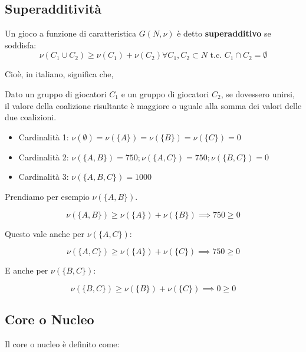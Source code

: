 \subsection{Superadditività}

Un gioco a funzione di caratteristica $G(N,\nu)$ è detto \textbf{superadditivo}
se soddisfa:
\[
    \nu(C_1 \cup C_2) \geq \nu(C_1) + \nu(C_2) \forall C_1,C_2 \subset N \text{ t.c. } C_1 \cap C_2 = \emptyset
\]

Cioè, in italiano, significa che,

\begin{definition}[Superadditività]
    Dato un gruppo di giocatori $C_1$ e un gruppo di giocatori $C_2$, se dovessero unirsi, il
    valore della coalizione risultante è maggiore o uguale alla somma dei valori
    delle due coalizioni.
\end{definition}

\begin{itemize}
    \item Cardinalità 1: $\nu(\emptyset) = \nu(\{A\}) = \nu(\{B\}) = \nu(\{C\}) = 0$
    \item Cardinalità 2: $\nu(\{A,B\}) = 750; \nu(\{A,C\}) = 750; \nu(\{B,C\}) = 0$
    \item Cardinalità 3: $\nu(\{A,B,C\}) = 1000$
\end{itemize}

Prendiamo per esempio $\nu(\{A,B\})$.

\begin{equation}
    \nu(\{A,B\}) \geq \nu(\{A\}) + \nu(\{B\}) \implies 750 \geq 0
\end{equation}

Questo vale anche per $\nu(\{A,C\})$:

\begin{equation}
    \nu(\{A,C\}) \geq \nu(\{A\}) + \nu(\{C\}) \implies 750 \geq 0
\end{equation}

E anche per $\nu(\{B,C\})$:

\begin{equation}
    \nu(\{B,C\}) \geq \nu(\{B\}) + \nu(\{C\}) \implies 0 \geq 0
\end{equation}

\subsection{Core o Nucleo}

Il core o nucleo è definito come:

